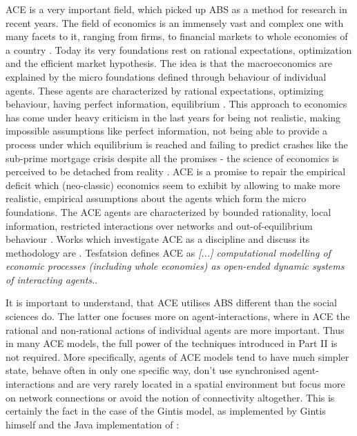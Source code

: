 ACE is a very important field, which picked up ABS as a method for research in recent years. The field of economics is an immensely vast and complex one with many facets to it, ranging from firms, to financial markets to whole economies of a country \cite{bowles_understanding_2005}. Today its very foundations rest on rational expectations, optimization and the efficient market hypothesis. The idea is that the macroeconomics are explained by the micro foundations \cite{colell_microeconomic_1995} defined through behaviour of individual agents. These agents are characterized by rational expectations, optimizing behaviour, having perfect information, equilibrium \cite{focardi_is_2015}.
This approach to economics has come under heavy criticism in the last years for being not realistic, making impossible assumptions like perfect information, not being able to provide a process under which equilibrium is reached \cite{kirman_complex_2010} and failing to predict crashes like the sub-prime mortgage crisis despite all the promises - the science of economics is perceived to be detached from reality \cite{focardi_is_2015}. 
ACE is a promise to repair the empirical deficit which (neo-classic) economics seem to exhibit by allowing to make more realistic, empirical assumptions about the agents which form the micro foundations. The ACE agents are characterized by bounded rationality, local information, restricted interactions over networks and out-of-equilibrium behaviour \cite{farmer_economy_2009}. 
Works which investigate ACE as a discipline and discuss its methodology are \cite{ballot_agent-based_2015,blume_introduction_2015,tesfatsion_agent-based_2002,richiardi_agent-based_2007}.
Tesfatsion \cite{tesfatsion_agent-based_2017} defines ACE as \textit{[...] computational modelling of economic processes (including whole economies) as open-ended dynamic systems of interacting agents.}. 

It is important to understand, that ACE utilises ABS different than the social sciences do. The latter one focuses more on agent-interactions, where in ACE the rational and non-rational actions of individual agents are more important. Thus in many ACE models, the full power of the techniques introduced in Part II is not required. More specifically, agents of ACE models tend to have much simpler state, behave often in only one specific way, don't use synchronised agent-interactions and are very rarely located in a spatial environment but focus more on network connections \cite{glasserman_contagion_2015,wilhite_economic_2006} or avoid the notion of connectivity altogether. This is certainly the fact in the case of the Gintis model, as implemented by Gintis himself and the Java implementation of \cite{evensen_extensible_2010}: 

